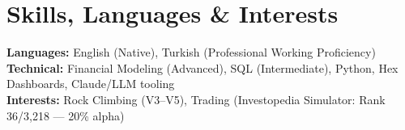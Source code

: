 \documentclass[letterpaper,11pt]{article}
\begin{document}
\section{Skills, Languages \& Interests}
\begin{itemize}[leftmargin=0.15in, label={}]
    \small{\item{
     \textbf{Languages:} English (Native), Turkish (Professional Working Proficiency) \\
     \textbf{Technical:} Financial Modeling (Advanced), SQL (Intermediate), Python, Hex Dashboards, Claude/LLM tooling \\
     \textbf{Interests:} Rock Climbing (V3--V5), Trading (Investopedia Simulator: Rank 36/3,218 — 20\% alpha)
    }}
\end{itemize}
\end{document}
